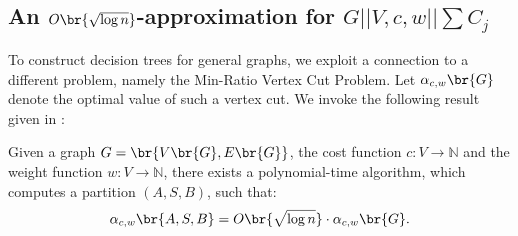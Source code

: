 \subsection{An $O\br{\sqrt{\log n}}$-approximation for $G||V,c,w||\sum C_j$}\label{serachingInGs}
To construct decision trees for general graphs, we exploit a connection to a different problem, 
namely the Min-Ratio Vertex Cut Problem. 
Let $\alpha_{c,w}\br{G}$ denote the optimal value of such a vertex cut. 
We invoke the following result given in \cite{Improvedapproximationalgorithmsvertexseparators}:

\begin{theorem}\label{approxmrvc}
    Given a graph $G=\br{V\br{G}, E\br{G}}$, the cost function $c:V\to\mathbb{N}$ and the weight function $w:V\to \mathbb{N}$, there exists a
polynomial-time algorithm, which computes a partition $(A, S, B)$, such that:
$$
\alpha_{c,w}\br{A,S,B}=O\br{\sqrt{\log n
}}\cdot\alpha_{c,w}\br{G}.
$$
\end{theorem}

